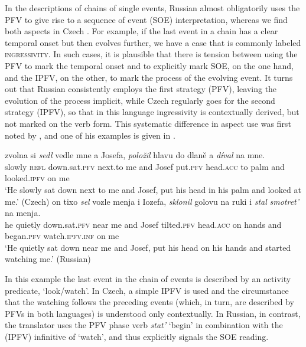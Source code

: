 \documentclass[output=paper,colorlinks,citecolor=brown]{langscibook}
\begin{document}
In the descriptions of chains of single events, Russian almost obligatorily uses the PFV to give rise to a sequence of event (SOE) interpretation, whereas we find both aspects in Czech \citep[][]{ivancev59/60,eckert84,monnesland1984,%
stunova93,Dickey2000,petruxina00,gehrke02,gehrke22,barentsen08,fortuin2015typology}. For example, if the last event in a chain has a clear temporal onset but then evolves further, we have a case that is commonly labeled \textsc{ingressivity}. In such cases, it is plausible that there is tension between using the PFV to mark the temporal onset and to explicitly mark SOE, on the one hand, and the IPFV, on the other, to mark the process of the evolving event. It turns out that Russian consistently employs the first strategy (PFV), leaving the evolution of the process implicit, while Czech regularly goes for the second strategy (IPFV), so that in this language ingressivity is contextually derived, but not marked on the verb form. This systematic difference in aspect use was first noted by \citet{ivancev59/60}, and one of his examples is given in  
\citep[from][36; Czech original by Božena Němcová; my own glosses and translations; relevant verb forms (here and in the following longer examples) italicised]{ivancev59/60}.

\ea\label{ex:ivancevingr}
\ea 
{} zvolna si \textit{sedl} vedle mne a Josefa, \textit{položil} hlavu do dlaně a \textit{díval} na mne.\\
    {} slowly \textsc{refl} down.sat.\textsc{pfv} next.to me and Josef put.\textsc{pfv} head.\textsc{acc} to palm and looked.\textsc{ipfv} on me\\
\glt    `He slowly sat down next to me and Josef, put his head in his palm and looked at me.' \hfill (Czech) 
\ex 
{} on tixo \textit{sel} vozle menja i Iozefa, \textit{sklonil} golovu na ruki i  \textit{stal} \textit{smotret'} na menja.\\
    {} he quietly down.sat.\textsc{pfv} near me and Josef tilted.\textsc{pfv} head.\textsc{acc} on hands and began.\textsc{pfv} watch.\textsc{ipfv.inf} on me\\
\glt    `He quietly sat down near me and Josef, put his head on his hands and started watching me.' \hfill (Russian)\label{ex:stal}
\z
\z 

\largerpage
\noindent 
In this example the last event in the chain of events is described by an activity predicate, `look/watch'. In Czech, a simple IPFV is used and the circumstance that the watching follows the preceding events (which, in turn, are described by PFVs in both languages) is understood only contextually. In Russian, in contrast, the translator uses the PFV phase verb \textit{stat'} `begin' in combination with the (IPFV) infinitive of `watch', and thus explicitly signals the SOE reading. 
\end{document}
